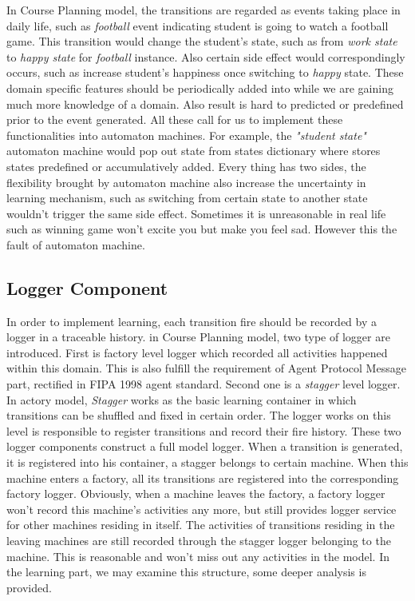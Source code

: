 \documentclass{sig-alternate}
\begin{document}
In Course Planning model, the transitions are regarded as events taking place in daily life, such as {\em football} event indicating student is going to watch a football game.  This transition would change the student's state, such as from {\em work state} to {\em happy state} for {\em football} instance.  Also certain side effect would correspondingly occurs, such as increase student's happiness once switching to {\em happy} state.   These domain specific features should be periodically added into while we are gaining much more knowledge of a domain.  Also result is hard to predicted or predefined prior to the event generated.  All these call for us to implement these functionalities into automaton machines. For example, the {\em "student state"} automaton machine would pop out state from states dictionary where stores states predefined or accumulatively added.  Every thing has two sides, the flexibility brought by automaton machine also increase the uncertainty in learning mechanism, such as switching from certain state to another state wouldn't trigger the same side effect. Sometimes it is unreasonable in real life such as winning game won't excite you but make you feel sad.  However this the fault of automaton machine. \\

\subsection {Logger Component}
In order to implement learning, each transition fire should be recorded by a logger in a traceable history.   in Course Planning model, two type of logger are introduced.  First is factory level logger which recorded all activities happened within this domain.  This is also fulfill the requirement of Agent Protocol Message part, rectified in FIPA 1998 agent standard\cite{FIPA1998}. Second one is a {\em stagger} level logger. In actory model, {\em Stagger} works as the basic learning container in which transitions can be shuffled and fixed in certain order.  The logger works on this level is responsible to register transitions and record their fire history.   These two logger components construct a full model logger.  When a transition is generated, it is registered into his container, a stagger belongs to certain machine.  When this machine enters a factory, all its transitions are registered into the corresponding factory logger.  Obviously,  when a machine leaves the factory, a factory logger won't record this machine's activities any more, but still provides logger service for other machines residing in itself.  The activities of transitions residing in the leaving machines are still recorded through the stagger logger belonging to the machine.  This is reasonable and won't miss out any activities in the model.  In the learning part, we may examine this structure, some deeper analysis is provided. 
\end{document}
